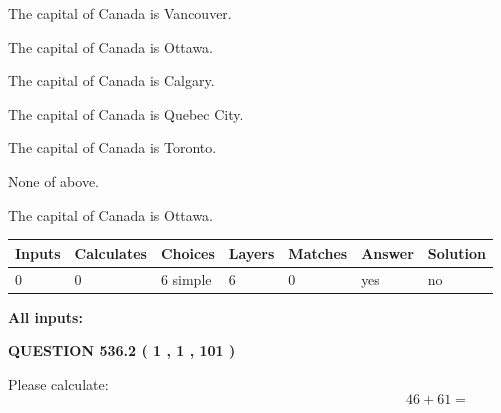 \documentclass[12pt]{article}
\begin{document}
 
The capital of Canada is Vancouver.
 
 
The capital of Canada is Ottawa.
 
 
The capital of Canada is Calgary.
 
 
The capital of Canada is Quebec City.
 
 
The capital of Canada is Toronto.
 
 
 None of above.
 
 
\noindent{}
 
 
The capital of Canada is Ottawa.
 
 
\noindent{}
 
 
   
   
   
   
\noindent\begin{tabular}{|l|l|l|l|l|l|l|}
 \hline
Inputs & Calculates & Choices & Layers & Matches & Answer & Solution \\ \hline
 0  & 
 0  & 
 6
  simple  
  & 
 6  & 
 0  & 
  yes & 
  no 
  \\ \hline
 \end{tabular}
   
   
   
   
\noindent{}
   
   
   
   
\noindent\vspace{0.1in}\hspace{-0.08in} {\textbf{\Large{All inputs: }}}
   
   
  
\vspace{0.2in}
  
{\textbf{\Large{QUESTION
536.2 
 ( 1 , 1 , 101 )
}}}
  
  
 
Please calculate:
\begin{equation}
46 +  %
61 = \nonumber
\end{equation}
 
 
 
\noindent{}
 
\end{document}
